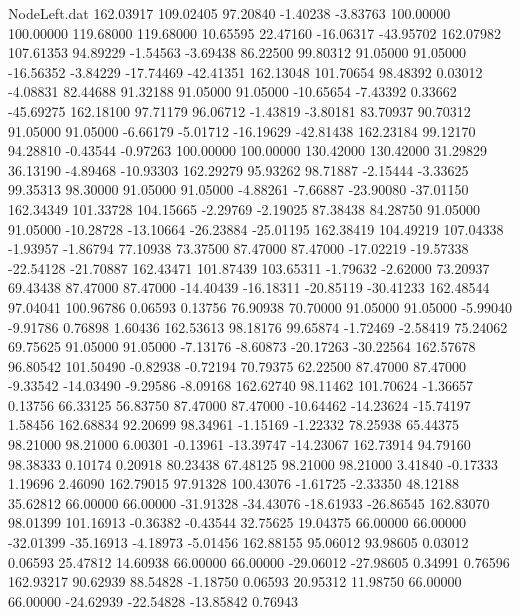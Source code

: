 \begin{filecontents}{NodeLeft.dat}
 162.03917  109.02405   97.20840    -1.40238   -3.83763  100.00000  100.00000  119.68000  119.68000   10.65595   22.47160  -16.06317  -43.95702
 162.07982  107.61353   94.89229    -1.54563   -3.69438   86.22500   99.80312   91.05000   91.05000  -16.56352   -3.84229  -17.74469  -42.41351
 162.13048  101.70654   98.48392     0.03012   -4.08831   82.44688   91.32188   91.05000   91.05000  -10.65654   -7.43392    0.33662  -45.69275
 162.18100   97.71179   96.06712    -1.43819   -3.80181   83.70937   90.70312   91.05000   91.05000   -6.66179   -5.01712  -16.19629  -42.81438
 162.23184   99.12170   94.28810    -0.43544   -0.97263  100.00000  100.00000  130.42000  130.42000   31.29829   36.13190   -4.89468  -10.93303
 162.29279   95.93262   98.71887    -2.15444   -3.33625   99.35313   98.30000   91.05000   91.05000   -4.88261   -7.66887  -23.90080  -37.01150
 162.34349  101.33728  104.15665    -2.29769   -2.19025   87.38438   84.28750   91.05000   91.05000  -10.28728  -13.10664  -26.23884  -25.01195
 162.38419  104.49219  107.04338    -1.93957   -1.86794   77.10938   73.37500   87.47000   87.47000  -17.02219  -19.57338  -22.54128  -21.70887
 162.43471  101.87439  103.65311    -1.79632   -2.62000   73.20937   69.43438   87.47000   87.47000  -14.40439  -16.18311  -20.85119  -30.41233
 162.48544   97.04041  100.96786     0.06593    0.13756   76.90938   70.70000   91.05000   91.05000   -5.99040   -9.91786    0.76898    1.60436
 162.53613   98.18176   99.65874    -1.72469   -2.58419   75.24062   69.75625   91.05000   91.05000   -7.13176   -8.60873  -20.17263  -30.22564
 162.57678   96.80542  101.50490    -0.82938   -0.72194   70.79375   62.22500   87.47000   87.47000   -9.33542  -14.03490   -9.29586   -8.09168
 162.62740   98.11462  101.70624    -1.36657    0.13756   66.33125   56.83750   87.47000   87.47000  -10.64462  -14.23624  -15.74197    1.58456
 162.68834   92.20699   98.34961    -1.15169   -1.22332   78.25938   65.44375   98.21000   98.21000    6.00301   -0.13961  -13.39747  -14.23067
 162.73914   94.79160   98.38333     0.10174    0.20918   80.23438   67.48125   98.21000   98.21000    3.41840   -0.17333    1.19696    2.46090
 162.79015   97.91328  100.43076    -1.61725   -2.33350   48.12188   35.62812   66.00000   66.00000  -31.91328  -34.43076  -18.61933  -26.86545
 162.83070   98.01399  101.16913    -0.36382   -0.43544   32.75625   19.04375   66.00000   66.00000  -32.01399  -35.16913   -4.18973   -5.01456
 162.88155   95.06012   93.98605     0.03012    0.06593   25.47812   14.60938   66.00000   66.00000  -29.06012  -27.98605    0.34991    0.76596
 162.93217   90.62939   88.54828    -1.18750    0.06593   20.95312   11.98750   66.00000   66.00000  -24.62939  -22.54828  -13.85842    0.76943

\end{filecontents}
